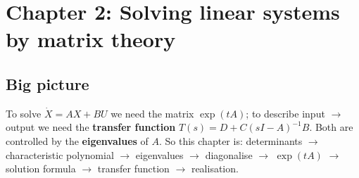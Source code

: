 \section{Chapter 2: Solving linear systems by matrix theory \texorpdfstring{}{}}
\label{ch2}

\subsection*{Big picture}
To solve $\dot X=AX+BU$ we need the matrix $\exp(tA)$; to describe input $\to$ output we need the
\textbf{transfer function} $T(s)=D+C(sI-A)^{-1}B$. Both are controlled by the \textbf{eigenvalues} of $A$.
So this chapter is: determinants $\to$ characteristic polynomial $\to$ eigenvalues $\to$ diagonalise $\to$ $\exp(tA)$ $\to$ solution formula $\to$ transfer function $\to$ realisation.

